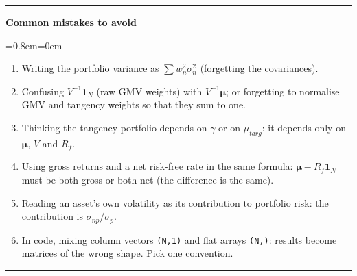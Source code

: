 \documentclass[11pt,a4paper]{report}
\newenvironment{notebox}[1]
  {\par\medskip\Needspace{6\baselineskip}\noindent\rule{\linewidth}{0.4pt}\par\nopagebreak
   \noindent\textbf{#1}\par\nopagebreak
   \begin{list}{}{\leftmargin=0.8em\rightmargin=0em\topsep=2pt}\item[]}
  {\end{list}\nopagebreak\noindent\rule{\linewidth}{0.4pt}\par\medskip}
\newenvironment{mistakes}{\begin{notebox}{Common mistakes to avoid}}{\end{notebox}}
\newcommand{\one}{\mathbf{1}_N}
\newcommand{\mub}{\bm{\mu}}
\begin{document}
\begin{mistakes}
\begin{enumerate}
  \item Writing the portfolio variance as $\sum w_n^2\sigma_n^2$ (forgetting the covariances).
  \item Confusing $V^{-1}\one$ (raw GMV weights) with $V^{-1}\mub$; or forgetting to
    normalise GMV and tangency weights so that they sum to one.
  \item Thinking the tangency portfolio depends on $\gamma$ or on $\mu_{targ}$: it
    depends only on $\mub$, $V$ and $R_f$.
  \item Using gross returns and a net risk-free rate in the same formula: $\mub-R_f\one$
    must be both gross or both net (the difference is the same).
  \item Reading an asset's own volatility as its contribution to portfolio risk:
    the contribution is $\sigma_{np}/\sigma_p$.
  \item In code, mixing column vectors \texttt{(N,1)} and flat arrays \texttt{(N,)}:
    results become matrices of the wrong shape. Pick one convention.
\end{enumerate}
\end{mistakes}
\end{document}
